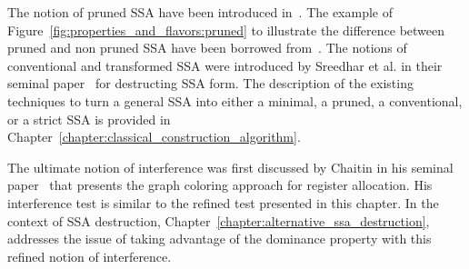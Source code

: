 The notion of pruned SSA  have been introduced in~\cite{ChoiJan91}. The example of Figure~\ref{fig:properties_and_flavors:pruned} to illustrate the difference between pruned and non pruned SSA have been borrowed from~\cite{CytronOct91}. 
The notions of conventional and transformed SSA were introduced by Sreedhar et al. in their seminal paper~\cite{SreedharSep99} for destructing SSA form.
The description of the existing techniques to turn a general SSA into either a minimal, a pruned, a conventional, or a strict SSA is provided in Chapter~\ref{chapter:classical_construction_algorithm}.

The ultimate notion of interference was first discussed by Chaitin in his seminal paper~\cite{Chaitin81} that presents the graph coloring approach for register allocation. His interference test is similar to the refined test presented in this chapter. In the context of SSA destruction, Chapter~\ref{chapter:alternative_ssa_destruction}, addresses the issue of taking advantage of the dominance property with this refined notion of interference.
 

